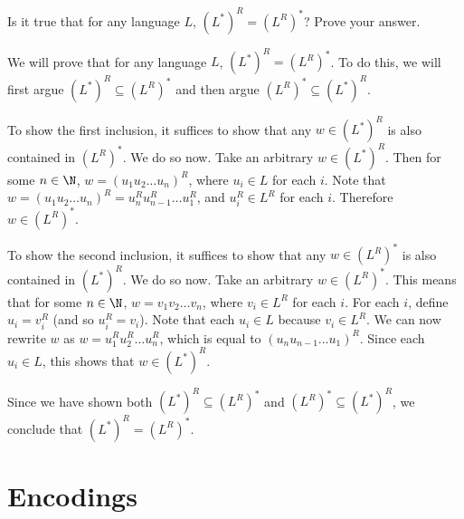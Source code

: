 \begin{flex}
\begin{exercise} \label{exercise:Can-you-interchange-star-and-reversal}
Is it true that for any language $L$, $(L^*)^R = (L^R)^*$? Prove your answer.
\end{exercise}


\begin{solution}
We will prove that for any language $L$, $(L^*)^R = (L^R)^*$. To do this, we will first argue $(L^*)^R \subseteq (L^R)^*$ and then argue $(L^R)^* \subseteq (L^*)^R$.

To show the first inclusion, it suffices to show that any $w \in (L^*)^R$ is also contained in $(L^R)^*$. We do so now. Take an arbitrary $w \in (L^*)^R$. Then for some $n \in \N$, $w = (u_1u_2\ldots u_n)^R$, where $u_i \in L$ for each $i$. Note that $w = (u_1u_2\ldots u_n)^R = u_n^R u_{n-1}^R \ldots u_1^R$, and $u_i^R \in L^R$ for each $i$. Therefore $w \in (L^R)^*$.

To show the second inclusion, it suffices to show that any $w \in (L^R)^*$ is also contained in $(L^*)^R$. We do so now. Take an arbitrary $w \in (L^R)^*$. This means that for some $n \in \N$, $w = v_1 v_2 \ldots v_n$, where $v_i \in L^R$ for each $i$. For each $i$, define $u_i = v_i^R$ (and so $u_i^R = v_i$). Note that each $u_i \in L$ because $v_i \in L^R$. We can now rewrite $w$ as $w = u_1^R u_2^R \ldots u_n^R$, which is equal to $(u_n u_{n-1} \ldots u_1)^R$. Since each $u_i \in L$, this shows that $w \in (L^*)^R$.

Since we have shown both $(L^*)^R \subseteq (L^R)^*$ and $(L^R)^* \subseteq (L^*)^R$, we conclude that $(L^*)^R = (L^R)^*$.
\end{solution}
\end{flex}




\section{Encodings}
\label{section:Encodings}


